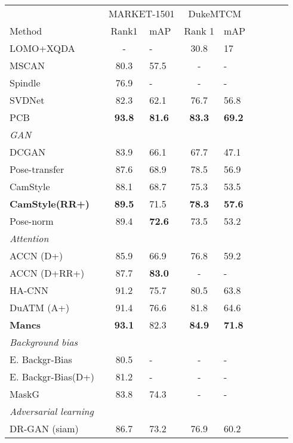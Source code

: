 \documentclass[10pt,twocolumn,letterpaper]{article}
\begin{document}
\begin{table}[h]
\footnotesize
\begin{tabular}
{lcl|clclcl}
 & \multicolumn{2}{c}{MARKET-1501} & \multicolumn{2}{c}{DukeMTCM} \\
Method & Rank1 & mAP & Rank 1 & mAP \\ \hline
LOMO+XQDA~\cite{liao2015person} & - & - & 30.8 & 17 \\
MSCAN~\cite{li2017learning} & 80.3 & 57.5 & - & - \\
Spindle~\cite{zhao2017spindle} & 76.9 & - & - & - \\
SVDNet~\cite{sun2017svdnet} & 82.3 & 62.1 & 76.7& 56.8 \\
PCB~\cite{sun2017beyond} & \textbf{93.8} & \textbf{81.6} & \textbf{83.3} & \textbf{69.2} \\ 
\hline
\textit{GAN} &  &  &  &  \\
DCGAN~\cite{zheng2017unlabeled} & 83.9 & 66.1 & 67.7 & 47.1 \\
Pose-transfer~\cite{liu2018pose} & 87.6 & 68.9 & 78.5 & 56.9 \\
CamStyle~\cite{zhong2017camera} & 88.1 & 68.7 & 75.3 & 53.5 \\
\textbf{CamStyle(RR+)}~\cite{zhong2017camera} &\textbf{89.5} & 71.5 & \textbf{78.3} & \textbf{57.6} \\
Pose-norm~\cite{qian2018pose} & 89.4 & \textbf{72.6} & 73.5 & 53.2 \\ 
\hline
\textit{Attention} &  &  &  &  \\
ACCN (D+)~\cite{xuattention} & 85.9 & 66.9 & 76.8 & 59.2 \\
ACCN (D+RR+)~\cite{xuattention} & 87.7 & \textbf{83.0} & - & - \\
HA-CNN~\cite{li2018harmonious} & 91.2 & 75.7 & 80.5 & 63.8 \\
DuATM (A+)~\cite{sidual} & 91.4 & 76.6 & 81.8 & 64.6 \\
\textbf{Mancs~\cite{wang2018mancs}}& \textbf{93.1} & 82.3 & \textbf{84.9} & \textbf{71.8} \\ \hline
\textit{Background bias} &  &  &  &  \\
E. Backgr-Bias~\cite{tian2018eliminating} & 80.5 & - & - & - \\ 
E. Backgr-Bias(D+)~\cite{tian2018eliminating} & 81.2 & - & - & - \\
MaskG\cite{song2018mask} & 83.8 & 74.3 & - & - \\
\hline
\textit{Adversarial learning} &  &  &  &  \\
DR-GAN (siam)~\cite{liu2018exploring} & 86.7 & 73.2 & 76.9 & 60.2 \\

\end{tabular}
\end{table}
\end{document}
